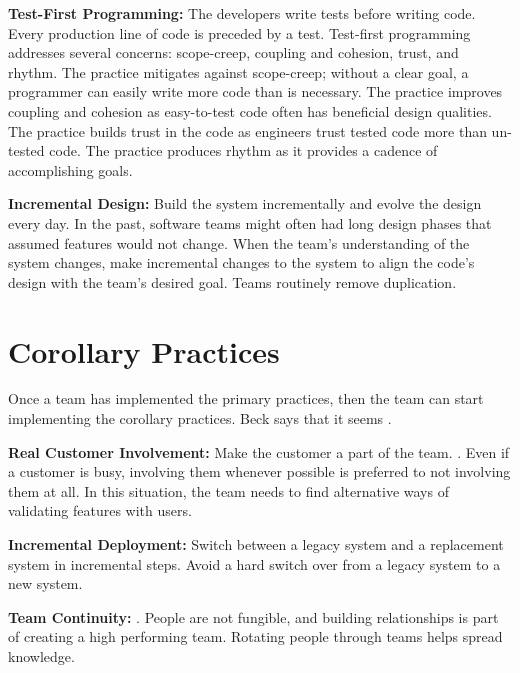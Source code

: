 \textbf{Test-First Programming:} The developers write tests before writing code. Every production line of code is preceded by a test.  Test-first programming addresses several concerns: scope-creep,  coupling and cohesion, trust, and rhythm. The practice mitigates against scope-creep; without a clear goal, a programmer can easily write more code than is necessary. The practice improves coupling and cohesion as easy-to-test code often has beneficial design qualities. The practice builds trust in the code as engineers trust tested code more than un-tested code. The practice produces rhythm as it provides a cadence of accomplishing goals.

\textbf{Incremental Design:} Build the system incrementally and evolve the design every day. In the past, software teams might often had long design phases that assumed features would not change. When the team’s understanding of the system changes, make incremental changes to the system to align the code’s design with the team’s desired goal. Teams routinely remove duplication.

\section{Corollary Practices}
Once a team has implemented the primary practices, then the team can start implementing the corollary practices. Beck says that it seems  \cite{BeckExtremeProgramming2004}.

\textbf{Real Customer Involvement:} Make the customer a part of the team.   \cite{BeckExtremeProgramming2004}. Even if a customer is busy, involving them whenever possible is preferred to not involving them at all. In this situation, the team needs to find alternative ways of validating features with users. 

\textbf{Incremental Deployment:} Switch between a legacy system and a replacement system in incremental steps. Avoid a hard switch over from a legacy system to a new system.


\textbf{Team Continuity:}   \cite{BeckExtremeProgramming2004}. People are not fungible, and building relationships is part of creating a high performing team. Rotating people through teams helps spread knowledge.


